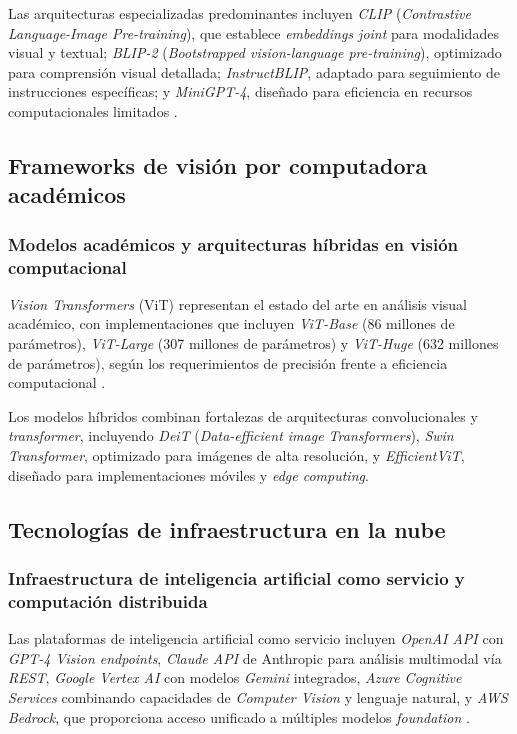 Las arquitecturas especializadas predominantes incluyen \textit{CLIP} (\textit{Contrastive Language-Image Pre-training}), que establece \textit{embeddings joint} para modalidades visual y textual; \textit{BLIP-2} (\textit{Bootstrapped vision-language pre-training}), optimizado para comprensión visual detallada; \textit{InstructBLIP}, adaptado para seguimiento de instrucciones específicas; y \textit{MiniGPT-4}, diseñado para eficiencia en recursos computacionales limitados \cite{Dosovitskiy2020, Dosovitskiy2020}.


\subsection{Frameworks de visión por computadora académicos}

\subsubsection{Modelos académicos y arquitecturas híbridas en visión computacional}

\textit{Vision Transformers} (ViT) representan el estado del arte en análisis visual académico, con implementaciones que incluyen \textit{ViT-Base} (86 millones de parámetros), \textit{ViT-Large} (307 millones de parámetros) y \textit{ViT-Huge} (632 millones de parámetros), según los requerimientos de precisión frente a eficiencia computacional \cite{ArticleRef255139}.

Los modelos híbridos combinan fortalezas de arquitecturas convolucionales y \textit{transformer}, incluyendo \textit{DeiT} (\textit{Data-efficient image Transformers}), \textit{Swin Transformer}, optimizado para imágenes de alta resolución, y \textit{EfficientViT}, diseñado para implementaciones móviles y \textit{edge computing}.


\subsection{Tecnologías de infraestructura en la nube}

\subsubsection{Infraestructura de inteligencia artificial como servicio y computación distribuida}

Las plataformas de inteligencia artificial como servicio incluyen \textit{OpenAI API} con \textit{GPT-4 Vision endpoints}, \textit{Claude API} de Anthropic para análisis multimodal vía \textit{REST}, \textit{Google Vertex AI} con modelos \textit{Gemini} integrados, \textit{Azure Cognitive Services} combinando capacidades de \textit{Computer Vision} y lenguaje natural, y \textit{AWS Bedrock}, que proporciona acceso unificado a múltiples modelos \textit{foundation} \cite{Dosovitskiy2020}.

